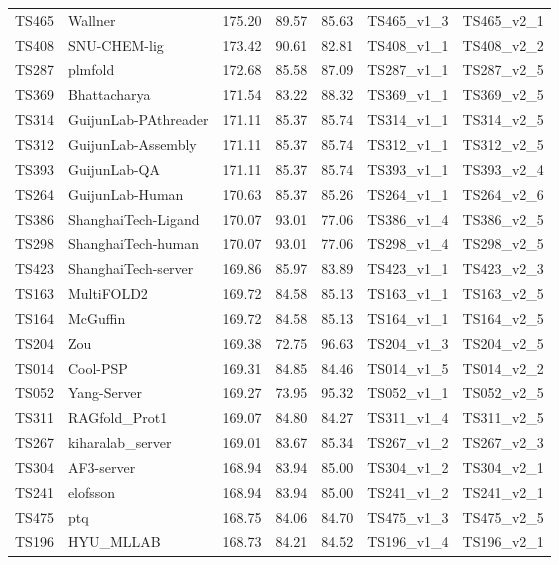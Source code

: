\begin{longtable}{lllllll}
TS465 & Wallner & 175.20 & 89.57 & 85.63 & TS465\_v1\_3 & TS465\_v2\_1 \\ 
TS408 & SNU-CHEM-lig & 173.42 & 90.61 & 82.81 & TS408\_v1\_1 & TS408\_v2\_2 \\ 
TS287 & plmfold & 172.68 & 85.58 & 87.09 & TS287\_v1\_1 & TS287\_v2\_5 \\ 
TS369 & Bhattacharya & 171.54 & 83.22 & 88.32 & TS369\_v1\_1 & TS369\_v2\_5 \\ 
TS314 & GuijunLab-PAthreader & 171.11 & 85.37 & 85.74 & TS314\_v1\_1 & TS314\_v2\_5 \\ 
TS312 & GuijunLab-Assembly & 171.11 & 85.37 & 85.74 & TS312\_v1\_1 & TS312\_v2\_5 \\ 
TS393 & GuijunLab-QA & 171.11 & 85.37 & 85.74 & TS393\_v1\_1 & TS393\_v2\_4 \\ 
TS264 & GuijunLab-Human & 170.63 & 85.37 & 85.26 & TS264\_v1\_1 & TS264\_v2\_6 \\ 
TS386 & ShanghaiTech-Ligand & 170.07 & 93.01 & 77.06 & TS386\_v1\_4 & TS386\_v2\_5 \\ 
TS298 & ShanghaiTech-human & 170.07 & 93.01 & 77.06 & TS298\_v1\_4 & TS298\_v2\_5 \\ 
TS423 & ShanghaiTech-server & 169.86 & 85.97 & 83.89 & TS423\_v1\_1 & TS423\_v2\_3 \\ 
TS163 & MultiFOLD2 & 169.72 & 84.58 & 85.13 & TS163\_v1\_1 & TS163\_v2\_5 \\ 
TS164 & McGuffin & 169.72 & 84.58 & 85.13 & TS164\_v1\_1 & TS164\_v2\_5 \\ 
TS204 & Zou & 169.38 & 72.75 & 96.63 & TS204\_v1\_3 & TS204\_v2\_5 \\ 
TS014 & Cool-PSP & 169.31 & 84.85 & 84.46 & TS014\_v1\_5 & TS014\_v2\_2 \\ 
TS052 & Yang-Server & 169.27 & 73.95 & 95.32 & TS052\_v1\_1 & TS052\_v2\_5 \\ 
TS311 & RAGfold\_Prot1 & 169.07 & 84.80 & 84.27 & TS311\_v1\_4 & TS311\_v2\_5 \\ 
TS267 & kiharalab\_server & 169.01 & 83.67 & 85.34 & TS267\_v1\_2 & TS267\_v2\_3 \\ 
TS304 & AF3-server & 168.94 & 83.94 & 85.00 & TS304\_v1\_2 & TS304\_v2\_1 \\ 
TS241 & elofsson & 168.94 & 83.94 & 85.00 & TS241\_v1\_2 & TS241\_v2\_1 \\ 
TS475 & ptq & 168.75 & 84.06 & 84.70 & TS475\_v1\_3 & TS475\_v2\_5 \\ 
TS196 & HYU\_MLLAB & 168.73 & 84.21 & 84.52 & TS196\_v1\_4 & TS196\_v2\_1 \\ 

\end{longtable}

